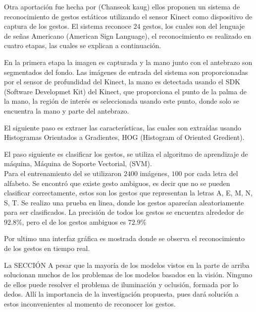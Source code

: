 
Otra aportación fue hecha por (Chanseok kaug) ellos proponen un sistema de reconocimiento de  gestos estáticos utilizando el sensor Kinect como dispositivo de captura de los gestos. El sistema reconoce $24$ gestos, los cuales son del lenguaje de señas Americano (American Sign Language), el reconocimiento es realizado en cuatro etapas, las cuales se explican a continuación.  

En la primera etapa la imagen es capturada y la mano junto con el antebrazo son segmentados del fondo. Las imágenes de entrada del sistema son proporcionadas por el sensor de profundidad del Kinect, la mano es detectada usando el SDK (Software Developmet Kit) del Kinect, que proporciona el punto de la palma de la mano, la región de interés es seleccionada usando este punto, donde  solo se encuentra la mano y parte del antebrazo.   

El siguiente paso es extraer las características, las cuales son extraídas usando Histogramas Orientados a Gradientes, HOG (Histogram of Oriented Gredient).  

El paso siguiente es clasificar los gestos, se utiliza el algoritmo de aprendizaje de máquina, Máquina de Soporte Vectorial, (SVM).\\
Para el entrenamiento del se utilizaron $2400$ imágenes, $100$ por cada letra del alfabeto. Se encontró que existe gesto ambiguos, es decir que no se pueden clasificar correctamente, estos son los gestos que representan la letras A, E, M, N, S, T. 
Se realizo una prueba en linea, donde los gestos aparecían aleatoriamente para ser clasificados. La precisión de todos los gestos se encuentra alrededor de $92.8 \%$, pero el de los gestos ambiguos es $72.9 \%$

Por ultimo una interfaz gráfica es mostrada donde se observa el reconocimiento de los gestos en tiempo real.  


La SECCIÓN A pesar que la mayoría de los modelos vistos en la parte de arriba solucionan muchos de los problemas de los modelos basados en la visi\'on. Ninguno de ellos puede resolver el problema de iluminaci\'on y oclusi\'on, formada por lo dedos. All\'i la importancia de la investigaci\'on propuesta, pues dar\'a soluci\'on a estos inconvenientes al momento de reconocer los gestos.
 
